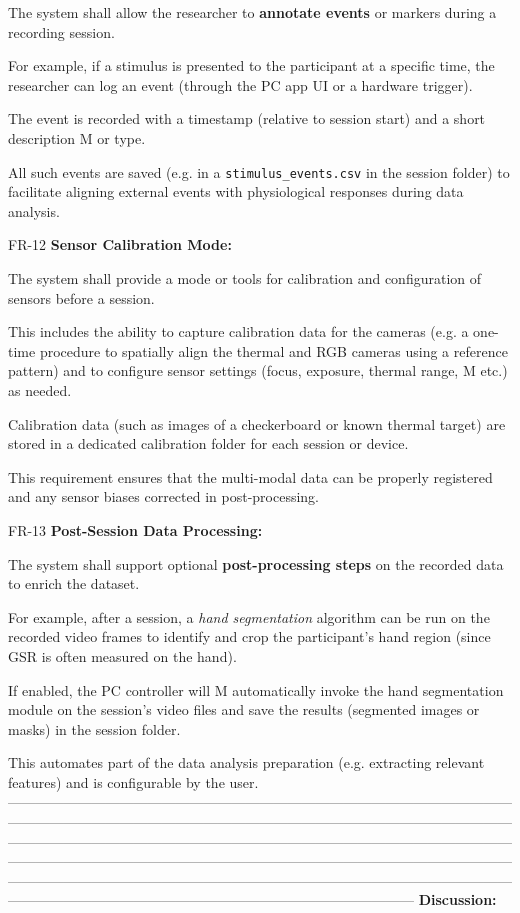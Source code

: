 The system shall allow the researcher to \textbf{annotate events}
 or markers during a recording session.

For example, if a stimulus is presented to the participant at a specific time, the
researcher can log an event (through the PC app UI or a hardware trigger).

The event is recorded with a timestamp (relative to session start) and a short
description M or type.

All such events are saved (e.g.  in a \texttt{stimulus\_events.csv} in the session
folder) to facilitate aligning external events with physiological responses during
data analysis.

FR-12 \textbf{Sensor Calibration Mode:}

The system shall provide a mode or tools for calibration and configuration of sensors
before a session.

This includes the ability to capture calibration data for the cameras (e.g.  a
one-time procedure to spatially align the thermal and RGB cameras using a reference
pattern) and to configure sensor settings (focus, exposure, thermal range, M etc.) as
needed.

Calibration data (such as images of a checkerboard or known thermal target) are
stored in a dedicated calibration folder for each session or device.

This requirement ensures that the multi-modal data can be properly registered and any
sensor biases corrected in post-processing.

FR-13 \textbf{Post-Session Data Processing:}

The system shall support optional \textbf{post-processing steps}
 on the recorded data to enrich the dataset.

For example, after a session, a \textit{hand segmentation} algorithm can be run on
the recorded video frames to identify and crop the participant's hand region (since
GSR is often measured on the hand).

If enabled, the PC controller will M automatically invoke the hand segmentation
module on the session's video files and save the results (segmented images or masks)
in the session folder.

This automates part of the data analysis preparation (e.g.  extracting relevant
features) and is configurable by the user.
---------------------------------------------------------------------------------------------------------------------------------------------------------------------------------------------------------------------------------------------------------------------------------------------------------------------------------------------------------------------------------------------------------------------------------------------------------------------------------------------------------------------------------------------------------------------------------------------------------------------------------------------------
\textbf{Discussion:}

